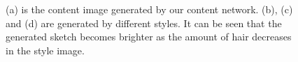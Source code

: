 \documentclass[10pt,twocolumn,letterpaper]{article}
\begin{document}
\begin{figure}[htbp]
\centering
{}
\caption{(a) is the content image generated by our content network. (b), (c) and (d) are generated by different styles. It can be seen that the generated sketch becomes brighter as the amount of hair decreases in the style image.}
\label{fig:style_result}
\end{figure}
\end{document}
